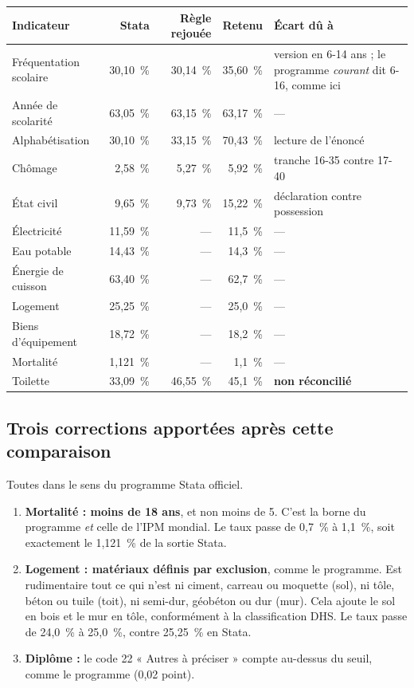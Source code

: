 \documentclass[11pt,a4paper]{article}
\begin{document}
\begin{center}
\small
\begin{tabular}{@{}lrrr>{\RaggedRight}p{4.6cm}@{}}
\toprule
\textbf{Indicateur} & \textbf{Stata} & \textbf{Règle rejouée} & \textbf{Retenu} & \textbf{Écart dû à} \\
\midrule
Fréquentation scolaire & 30,10~\% & 30,14~\% & 35,60~\% & version en 6-14 ans ; le programme
  \emph{courant} dit 6-16, comme ici \\
Année de scolarité & 63,05~\% & 63,15~\% & 63,17~\% & --- \\
Alphabétisation & 30,10~\% & 33,15~\% & 70,43~\% & lecture de l'énoncé \\
Chômage & 2,58~\% & 5,27~\% & 5,92~\% & tranche 16-35 contre 17-40 \\
État civil & 9,65~\% & 9,73~\% & 15,22~\% & déclaration contre possession \\
Électricité & 11,59~\% & --- & 11,5~\% & --- \\
Eau potable & 14,43~\% & --- & 14,3~\% & --- \\
Énergie de cuisson & 63,40~\% & --- & 62,7~\% & --- \\
Logement & 25,25~\% & --- & 25,0~\% & --- \\
Biens d'équipement & 18,72~\% & --- & 18,2~\% & --- \\
Mortalité & 1,121~\% & --- & 1,1~\% & --- \\
Toilette & 33,09~\% & 46,55~\% & 45,1~\% & \textbf{non réconcilié} \\
\bottomrule
\end{tabular}
\end{center}

\subsection{Trois corrections apportées après cette comparaison}

Toutes dans le sens du programme Stata officiel.

\begin{enumerate}
  \item \textbf{Mortalité : moins de 18 ans}, et non moins de 5. C'est la borne du programme
        \emph{et} celle de l'IPM mondial. Le taux passe de 0,7~\% à 1,1~\%, soit exactement le
        1,121~\% de la sortie Stata.
  \item \textbf{Logement : matériaux définis par exclusion}, comme le programme. Est rudimentaire
        tout ce qui n'est ni ciment, carreau ou moquette (sol), ni tôle, béton ou tuile (toit), ni
        semi-dur, géobéton ou dur (mur). Cela ajoute le sol en bois et le mur en tôle, conformément
        à la classification DHS. Le taux passe de 24,0~\% à 25,0~\%, contre 25,25~\% en Stata.
  \item \textbf{Diplôme :} le code 22 « Autres à préciser » compte au-dessus du seuil, comme le
        programme (0,02 point).
\end{enumerate}
\end{document}
